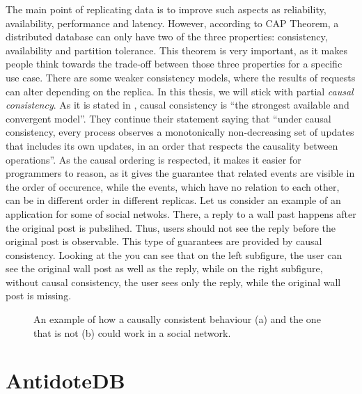 The main point of replicating data is to improve such aspects as reliability, availability, performance and latency. However, according to CAP Theorem\cite{29}, a distributed database can only have two of the three properties: consistency, availability and partition tolerance. This theorem is very important, as it makes people think towards the trade-off between those three properties for a specific use case. There are some weaker consistency models, where the results of requests can alter depending on the replica\cite{28}.  In this thesis, we will stick with partial \textit{causal consistency}. As it is stated in \citet{7}, causal consistency is ``the strongest available and convergent model''. They continue their statement saying that ``under causal consistency, every process observes a monotonically non-decreasing set of updates that includes its own updates, in an order that respects the causality between operations''. As the causal ordering is respected, it makes it easier for programmers to reason, as it gives the guarantee that related events are visible in the order of occurence, while the events, which have no relation to each other, can be in different order in different replicas. Let us consider an example of an application for some of social netwoks. There, a reply to a wall past happens after the original post is pubslihed. Thus, users should not see the reply before the original post is observable. This type of guarantees are provided by causal consistency. Looking at the  you can see that on the left subfigure, the user can see the original wall post as well as the reply, while on the right subfigure, without causal consistency, the user sees only the reply, while the original wall post is missing. 

\begin{figure}%
    \centering
    \def\svgwidth{0.4\linewidth}
    \subfloat[]{{}}%
    \qquad
    \def\svgwidth{0.4\linewidth}
    \subfloat[]{{}}%
    \caption{An example of how a causally consistent behaviour (a) and the one that is not (b) could work in a social network.}%
    \label{fig:theory3}%
\end{figure}





\section{AntidoteDB}
\label{2-antidotedb}

